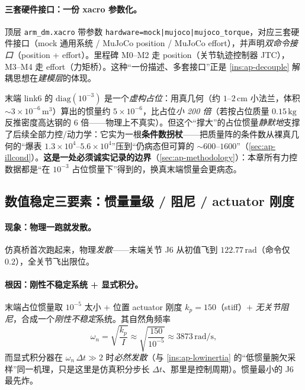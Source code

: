 \paragraph{三套硬件接口：一份 xacro 参数化。}
顶层 \texttt{arm\_dm.\allowbreak xacro} 带参数 \texttt{hardware=mock|mujoco|mujoco\_torque}，对应三套硬件接口（mock 通用系统 / MuJoCo position / MuJoCo effort），并声明\emph{双命令接口}（position + effort）。里程碑 M0--M2 走 position（关节轨迹控制器 JTC），M3--M4 走 effort（力矩桥）。这种“一份描述、多套接口”正是 \cref{ins:ap-decouple} 解耦思想在\emph{建模层}的体现。

\begin{insight}\label{ins:ap-placeholder}
末端 link6 的 $\mathrm{diag}(10^{-3})$ 是一个\emph{虚构占位}：用真几何（约 $1$--$2\,\mathrm{cm}$ 小法兰，体积 $\sim3\times10^{-6}\,\mathrm{m^3}$）算出的惯量约 $5\times10^{-6}$，比占位\emph{小 200 倍}（若按占位质量 $0.15\,\mathrm{kg}$ 反推密度高达钢的 $6$ 倍——物理上不真实）。但这个“撑大”的占位惯量\emph{静默地}支撑了后续全部力控/动力学：它实为一根\textbf{条件数拐杖}——把质量阵的条件数从裸真几何的“爆表 $1.3\!\times\!10^4$--$5.6\!\times\!10^4$”压到“仍病态但可算的 $\sim 600$--$1600$”（\cref{sec:ap-illcond}）。\textbf{这是一处必须诚实记录的边界}（\cref{sec:ap-methodology}）：本章所有力控数据都是“在 $10^{-3}$ 占位惯量下”得到的，换真末端惯量会更病态。
\end{insight}

\subsection{数值稳定三要素：惯量量级 / 阻尼 / actuator 刚度}
\label{sec:ap-num-explode}

\paragraph{现象：物理一跑就发散。}
仿真桥首次跑起来，物理\emph{发散}——末端关节 J6 从初值飞到 $122.77\,\mathrm{rad}$（命令仅 $0.2$），全关节飞出限位。

\paragraph{根因：刚性不稳定系统 + 显式积分。}
末端占位惯量取 $10^{-5}$ 太小 $+$ 位置 actuator 刚度 $k_p=150$（stiff）$+$ \emph{无关节阻尼}，合成一个\emph{刚性不稳定}系统。其自然角频率
\begin{equation}
  \omega_n=\sqrt{\frac{k_p}{I}}\approx\sqrt{\frac{150}{10^{-5}}}\approx 3873\,\mathrm{rad/s},
  \label{eq:ap-omegan}
\end{equation}
而显式积分器在 $\omega_n\,\Delta t\gg 2$ 时\emph{必然发散}（与 \cref{ins:ap-lowinertia} 的“低惯量腕欠采样”同一机理，只是这里是仿真积分步长 $\Delta t$、那里是控制周期）。惯量最小的 J6 最先炸。


